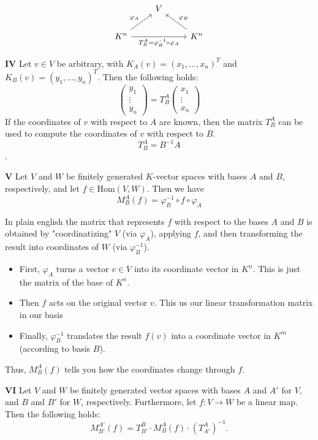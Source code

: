 \[
\begin{tikzcd}
& V & \\
K^n \arrow[ur, "\varphi_A"] \arrow[rr, "T_{B}^{A} = \varphi_B^{-1} \circ \varphi_A"'] & & K^n \arrow[ul, "\varphi_B"']
\end{tikzcd}
\]

 \textbf{IV} Let \( v \in V \) be arbitrary, 
with \( K_A(v) = (x_1, \ldots, x_n)^T \) 
and \( K_B(v) = (y_1, \ldots, y_n)^T \).  
Then the following holds:
\[
\begin{pmatrix}
y_1 \\
\vdots \\
y_n
\end{pmatrix}
=
T_B^A
\begin{pmatrix}
x_1 \\
\vdots \\
x_n
\end{pmatrix}
\]
If the coordinates of \( v \) with respect to \( A \) are known, then the matrix \( T_B^A \) can be used to compute the coordinates of \( v \) with respect to \( B \).
\[ T_B^A = B^{-1}A \].

 \textbf{V} Let \( V \) and \( W \) be finitely 
generated \( K \)-vector spaces with 
bases \( A \) and \( B \), respectively, and let \( f \in \mathrm{Hom}(V, W) \).
Then we have
\[
M_B^A(f) = \varphi_B^{-1} \circ f \circ \varphi_A
\]

In plain english the matrix that represents \( f \) with respect to 
the bases \( A \) and \( B \)
 is obtained by "coordinatizing" \( V \) (via \( \varphi_A \)), 
 applying \( f \), and then transforming the result into coordinates of 
 \( W \) (via \( \varphi_B^{-1} \)).

\begin{itemize}[label=\(-\)]
    \item First, \( \varphi_A \) turns a vector \( v \in V \) 
    into its coordinate vector in \( K^n \). This is just the matrix of the 
    base of \(K^n\).
    \item Then \( f \) acts on the original vector \( v \). This us our linear transformation matrix in our
    basis
    \item  Finally, \( \varphi_B^{-1} \) translates the result \( f(v) \) into a 
coordinate vector in \( K^m \) (according to basis \( B \)).
\end{itemize}

Thus, \( M_B^A(f) \) tells you how the coordinates change through \( f \).

 \textbf{VI} Let \( V \) and \( W \) be finitely generated vector spaces with bases \( A \) and \( A' \) for \( V \), and \( B \) and \( B' \) for \( W \), respectively.  
Furthermore, let \( f: V \to W \) be a linear map. Then the following holds:
\[
M_{B'}^{A'}(f) = T_{B'}^{B} \cdot M_{B}^{A}(f) \cdot \left( T_{A'}^{A} \right)^{-1}.
\]

